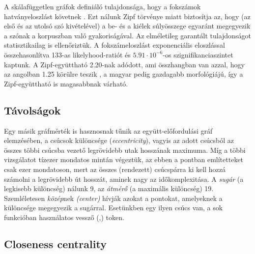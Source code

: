 \documentclass{llncs}
\newcommand{\embf}[1]{\textbf{#1}}
\newcommand{\bness}{bness}   %
\begin{document}
A skálafüggetlen gráfok definiáló tulajdonsága, hogy a fokszámok
hatványeloszlást követnek \cite{barabasi1999emergence}. Ezt nálunk Zipf
törvénye miatt biztosítja az, hogy (az első és az utolsó szó kivételével) a be-
és a kiélek súlyösszege egyaránt megegyezik a szónak a korpuszban való
gyakoriságával.  Az elméletileg garantált tulajdonságot statisztikailag is
ellenőriztük.  A fokszámeloszlást exponenciális eloszlással összehasonlítva
133-as likelyhood-ratiót és $5.91\cdot 10^{-6}$-os szignifikanciaszintet
kaptunk. A Zipf-együttható 2.20-nak adódott, ami összhangban van azzal, hogy az
angolban 1.25 körülre teszik \cite{Kornai:2008}, a magyar pedig gazdagabb
morfológiájú, így a Zipf-együttható is magasabbnak várható.

\subsection{Távolságok}

Egy másik gráfmérték is hasznosnak tűnik az együtt-előfordulási gráf
elemzésében, a csúcsok különcsége (\emph{eccentricity}), vagyis az adott
csúcsból az összes többi csúcsba vezető legrövidebb utak hosszának maximuma.
Míg a többi vizsgálatot tízezer mondatos mintán végeztük, az ebben a pontban
említetteket csak ezer mondatoson, mert az összes (rendezett) csúcspárra ki
kell hozzá számolni a legrövidebb út hosszát, aminek nagy az időkomplexitása.
A \emph{sugár} (a legkisebb különcség) nálunk 9,
az \emph{átmérő} (a maximális különcség) 19.
Szemléletesen \emph{közép}nek \emph{(center)}
hívják azokat a pontokat, amelyeknek a különcsége megegyezik a sugárral.
Esetünkben egy ilyen csúcs van, a sok funkcióban használatos vessző (,) token.


\subsection{Closeness centrality}
\end{document}
